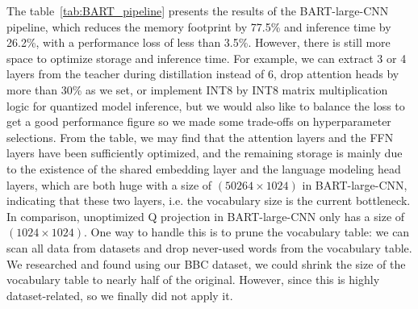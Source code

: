 \documentclass{article}
\begin{document}
    \hspace*{1em} The table~\ref{tab:BART_pipeline} presents the results of the BART-large-CNN pipeline, which reduces the memory footprint by 77.5\% and inference time by 26.2\%, with a performance loss of less than 3.5\%. However, there is still more space to optimize storage and inference time. For example, we can extract 3 or 4 layers from the teacher during distillation instead of 6, drop attention heads by more than 30\% as we set, or implement INT8 by INT8 matrix multiplication logic for quantized model inference, but we would also like to balance the loss to get a good performance figure so we made some trade-offs on hyperparameter selections. From the table, we may find that the attention layers and the FFN layers have been sufficiently optimized, and the remaining storage is mainly due to the existence of the shared embedding layer and the language modeling head layers, which are both huge with a size of $(50264 \times 1024)$ in BART-large-CNN, indicating that these two layers, i.e. the vocabulary size is the current bottleneck. In comparison, unoptimized Q projection in BART-large-CNN only has a size of $(1024 \times 1024)$. One way to handle this is to prune the vocabulary table: we can scan all data from datasets and drop never-used words from the vocabulary table. We researched and found using our BBC dataset, we could shrink the size of the vocabulary table to nearly half of the original. However, since this is highly dataset-related, so we finally did not apply it.
\end{document}
